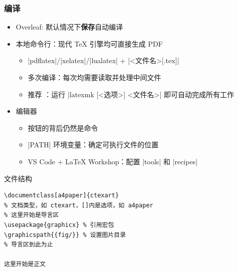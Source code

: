 \begin{frame}[fragile]
  \frametitle{编译}
  \begin{itemize}
    \item Overleaf: 默认情况下\textbf{保存}自动编译
    \item 本地命令行：现代 \TeX{} 引擎均可直接生成 PDF
      \begin{itemize}
        \item |pdflatex|/|xelatex|/|lualatex| + |<文件名>[.tex]|
        \item 多次编译：每次均需要读取并处理中间文件
        \item 推荐 ：运行 |latexmk [<选项>] <文件名>| 即可自动完成所有工作
      \end{itemize}

    \item 编辑器

      \begin{itemize}
        \item 按钮的背后仍然是命令
        \item |PATH| 环境变量：确定可执行文件的位置
        \item VS Code + \LaTeX{} Workshop：配置 |tools| 和 |recipes|
      \end{itemize}
  \end{itemize}
\end{frame}


\begin{frame}[fragile]{文件结构}
  \lstset{language=[LaTeX]TeX}
  \begin{lstlisting}[basicstyle=\ttfamily]
\documentclass[a4paper]{ctexart}
% 文档类型，如 ctexart，[]内是选项，如 a4paper
% 这里开始是导言区
\usepackage{graphicx} % 引用宏包
\graphicspath{{fig/}} % 设置图片目录
% 导言区到此为止

这里开始是正文

  \end{lstlisting}
\end{frame}

